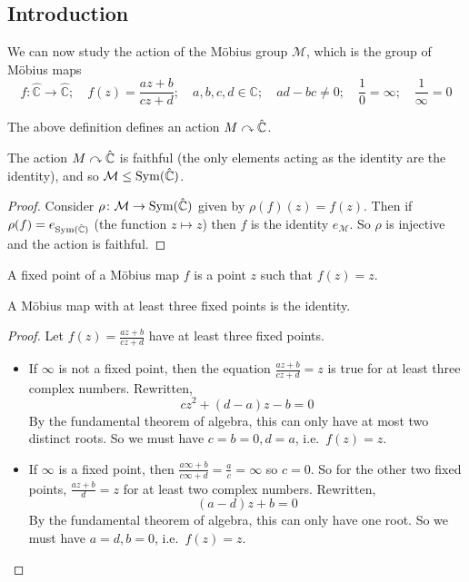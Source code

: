 \subsection{Introduction}
We can now study the action of the M\"obius group \(\mathcal M\), which is the group of M\"obius maps
\[
	f\colon \hat{\mathbb C} \to \hat{\mathbb C};\quad f(z) = \frac{az+b}{cz+d};\quad a,b,c,d\in\mathbb C;\quad ad-bc\neq 0;\quad \frac{1}{0}=\infty;\quad\frac{1}{\infty}=0
\]
\begin{remark}
	The above definition defines an action \(M \curvearrowright \hat{\mathbb C}\).
\end{remark}
\begin{proposition}
	The action \(M \curvearrowright \hat{\mathbb C}\) is faithful (the only elements acting as the identity are the identity), and so \(\mathcal M \leq \operatorname{Sym}(\hat{\mathbb C})\).
\end{proposition}
\begin{proof}
	Consider \(\rho\colon \mathcal M \to \operatorname{Sym}(\hat{\mathbb C})\) given by \(\rho(f)(z) = f(z)\).
	Then if \(\rho(f) = e_{\operatorname{Sym}(\hat{\mathbb C})}\) (the function \(z \mapsto z\)) then \(f\) is the identity \(e_{\mathcal M}\).
	So \(\rho\) is injective and the action is faithful.
\end{proof}
\begin{definition}
	A fixed point of a M\"obius map \(f\) is a point \(z\) such that \(f(z) = z\).
\end{definition}
\begin{theorem}
	A M\"obius map with at least three fixed points is the identity.
\end{theorem}
\begin{proof}
	Let \(f(z) = \frac{az+b}{cz+d}\) have at least three fixed points.
	\begin{itemize}
		\item If \(\infty\) is not a fixed point, then the equation \(\frac{az+b}{cz+d} = z\) is true for at least three complex numbers.
		      Rewritten,
		      \[
			      cz^2 + (d-a)z-b=0
		      \]
		      By the fundamental theorem of algebra, this can only have at most two distinct roots.
		      So we must have \(c=b=0, d=a\), i.e.\ \(f(z) = z\).
		\item If \(\infty\) is a fixed point, then \(\frac{a\infty + b}{c\infty + d} = \frac{a}{c} = \infty\) so \(c = 0\).
		      So for the other two fixed points, \(\frac{az+b}{d} = z\) for at least two complex numbers.
		      Rewritten,
		      \[
			      (a-d)z+b=0
		      \]
		      By the fundamental theorem of algebra, this can only have one root.
		      So we must have \(a=d,b=0\), i.e.\ \(f(z) = z\).
	\end{itemize}
\end{proof}
